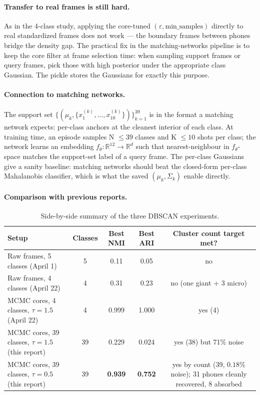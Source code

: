 \documentclass[11pt]{article}
\begin{document}
\paragraph{Transfer to real frames is still hard.} As in the 4-class study, applying the core-tuned $(\varepsilon, \text{min\_samples})$ directly to real standardized frames does not work --- the boundary frames between phones bridge the density gap. The practical fix in the matching-networks pipeline is to keep the core filter at frame selection time: when sampling support frames or query frames, pick those with high posterior under the appropriate class Gaussian. The pickle stores the Gaussians for exactly this purpose.

\paragraph{Connection to matching networks.} The support set $\{(\mu_k, \{x^{(k)}_1, \dots, x^{(k)}_{10}\})\}_{k=1}^{39}$ is in the format a matching network expects: per-class anchors at the cleanest interior of each class. At training time, an episode samples N $\le 39$ classes and K $\le 10$ shots per class; the network learns an embedding $f_\theta: \mathbb{R}^{12} \to \mathbb{R}^{d}$ such that nearest-neighbour in $f_\theta$-space matches the support-set label of a query frame. The per-class Gaussians give a sanity baseline: matching networks should beat the closed-form per-class Mahalanobis classifier, which is what the saved $(\mu_k, \Sigma_k)$ enable directly.

\paragraph{Comparison with previous reports.}
\begin{table}[H]
\centering
\caption{Side-by-side summary of the three DBSCAN experiments.}
\begin{tabular}{lcccc}
\toprule
Setup & Classes & Best NMI & Best ARI & Cluster count target met? \\
\midrule
Raw frames, 5 classes (April 1)         &  5 & 0.11 & 0.05 & no \\
Raw frames, 4 classes (April 22)        &  4 & 0.31 & 0.23 & no (one giant + 3 micro) \\
MCMC cores, 4 classes, $\tau = 1.5$ (April 22)   &  4 & 0.999 & 1.000 & yes (4) \\
MCMC cores, 39 classes, $\tau = 1.5$ (this report) & 39 & 0.229 & 0.024 & yes (38) but 71\% noise \\
\rowcolor{green!10}
MCMC cores, 39 classes, $\tau = 0.5$ (this report) & 39 & \textbf{0.939} & \textbf{0.752} & yes by count (39, $0.18\%$ noise); 31 phones cleanly recovered, 8 absorbed \\
\bottomrule
\end{tabular}
\end{table}
\end{document}
